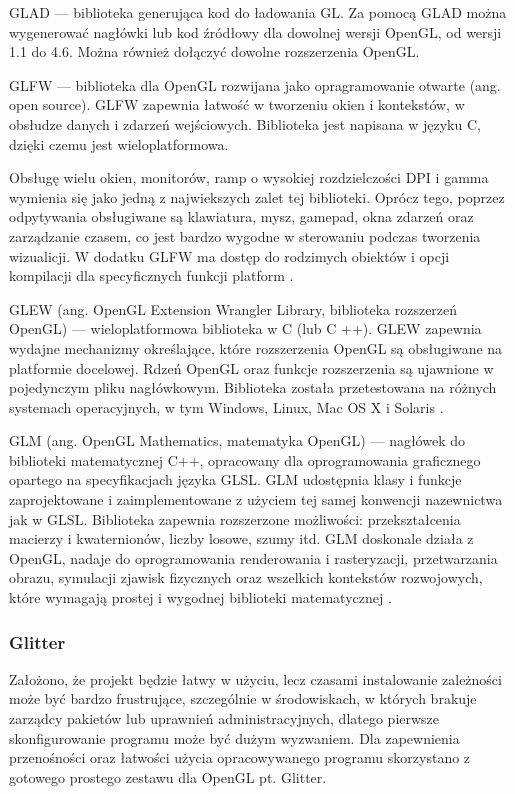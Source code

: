 GLAD --- biblioteka generująca kod do ładowania GL. Za pomocą GLAD można wygenerować nagłówki lub kod źródłowy dla dowolnej wersji OpenGL, od wersji 1.1 do 4.6. Można również dołączyć dowolne rozszerzenia OpenGL.

GLFW --- biblioteka dla OpenGL rozwijana jako opragramowanie otwarte (ang. open source). GLFW zapewnia łatwość w tworzeniu okien i kontekstów, w obsłudze danych i zdarzeń wejściowych. Biblioteka jest napisana w języku C, dzięki czemu jest wieloplatformowa.  

Obsługę wielu okien, monitorów, ramp o wysokiej rozdzielczości DPI i gamma wymienia się jako jedną z najwiekszych zalet tej biblioteki. Oprócz tego, poprzez odpytywania obsługiwane są klawiatura, mysz, gamepad, okna zdarzeń oraz zarządzanie czasem, co jest bardzo wygodne w sterowaniu podczas tworzenia wizualicji. W dodatku GLFW ma dostęp do rodzimych obiektów i opcji kompilacji dla specyficznych funkcji platform \cite{glfw}.

GLEW (ang. OpenGL Extension Wrangler Library, biblioteka rozszerzeń OpenGL) --- wieloplatformowa biblioteka w C (lub C ++). GLEW zapewnia wydajne mechanizmy określające, które rozszerzenia OpenGL są obsługiwane na platformie docelowej. Rdzeń OpenGL oraz funkcje rozszerzenia są ujawnione w pojedynczym pliku nagłówkowym. Biblioteka została przetestowana na różnych systemach operacyjnych, w tym Windows, Linux, Mac OS X i Solaris \cite{glew}.

GLM (ang. OpenGL Mathematics, matematyka OpenGL) --- nagłówek do biblioteki matematycznej C++, opracowany dla oprogramowania graficznego opartego na specyfikacjach języka GLSL. GLM udostępnia klasy i funkcje zaprojektowane i zaimplementowane z użyciem tej samej konwencji nazewnictwa jak w GLSL. Biblioteka zapewnia rozszerzone możliwości: przekształcenia macierzy i kwaternionów, liczby losowe, szumy itd. GLM doskonale działa z OpenGL, nadaje do oprogramowania renderowania i rasteryzacji, przetwarzania obrazu, symulacji zjawisk fizycznych oraz wszelkich kontekstów rozwojowych, które wymagają prostej i wygodnej biblioteki matematycznej \cite{glm}. 

\subsubsection{Glitter}
Założono, że projekt będzie łatwy w użyciu, lecz czasami instalowanie zależności może być bardzo frustrujące, szczególnie w środowiskach, w których brakuje zarządcy pakietów lub uprawnień administracyjnych, dlatego pierwsze skonfigurowanie programu może być dużym wyzwaniem. Dla zapewnienia przenośności oraz łatwości użycia opracowywanego programu skorzystano z gotowego prostego zestawu dla OpenGL pt. Glitter.


